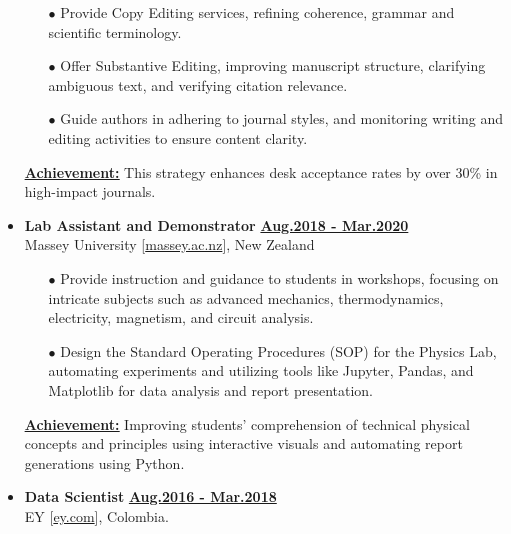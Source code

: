 \begin{itemize}[leftmargin=5mm]
\begin{itemize}[leftmargin=0mm]
              \item[$\bullet$] Provide Copy Editing services, refining coherence, grammar and scientific terminology.
              \item[$\bullet$] Offer Substantive Editing, improving manuscript structure, clarifying ambiguous text, and verifying citation relevance.
              \item[$\bullet$] Guide authors in adhering to journal styles, and monitoring writing and editing activities to ensure content clarity.
          \end{itemize}

          \textbf{\href{.}{\underline{Achievement:}}}
          This strategy enhances desk acceptance rates by over 30\% in high-impact journals.


    \item \textbf{\large Lab Assistant and Demonstrator}\hfill
          \href{.}{\bf Aug.2018 - Mar.2020}\\
          Massey University [\href{www.massey.ac.nz}{massey.ac.nz}],
          New Zealand

          \begin{itemize}[leftmargin=0mm]
              \small
              \itemsep-1mm

              \item[$\bullet$] Provide instruction and guidance to students in workshops, focusing on intricate subjects such as advanced mechanics, thermodynamics, electricity, magnetism, and circuit analysis.
              \item[$\bullet$] Design the Standard Operating Procedures (SOP) for the Physics Lab, automating experiments and utilizing tools like Jupyter, Pandas, and Matplotlib for data analysis and report presentation.
          \end{itemize}

          \textbf{\href{.}{\underline{Achievement:}}}
          Improving students' comprehension of technical physical concepts and principles using interactive visuals and automating report generations using Python.

    \item \textbf{\large Data Scientist}\hfill
          \href{.}{\bf Aug.2016 - Mar.2018}\\
          EY [\href{www.ey.com}{ey.com}],
          Colombia.

          \begin{itemize}[leftmargin=0mm]
              \small
              \itemsep-1mm


\end{itemize}
\end{itemize}
